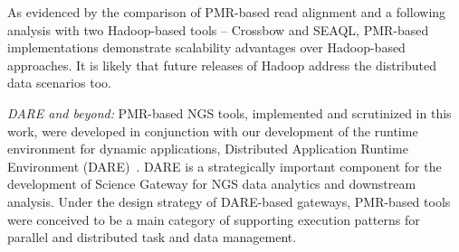 \documentclass{acm_proc_article-sp}
\begin{document}

As evidenced by the comparison of PMR-based read alignment and a
following analysis with two Hadoop-based tools -- Crossbow and SEAQL,
PMR-based implementations demonstrate scalability advantages over
Hadoop-based approaches. It is likely that future releases of Hadoop
address the distributed data scenarios too.

%


\textit{DARE and beyond: }PMR-based NGS tools, implemented and
scrutinized in this work, were developed in conjunction with our
development of the runtime environment for dynamic applications,
Distributed Application Runtime Environment
(DARE)~\cite{dare-tg11,dare-ecmls11}.  DARE is a strategically
important component for the development of Science Gateway for NGS
data analytics and downstream analysis.  Under the design strategy of
DARE-based gateways, PMR-based tools were conceived to be a main
category of supporting execution patterns for parallel and distributed
task and data management.
\end{document}
